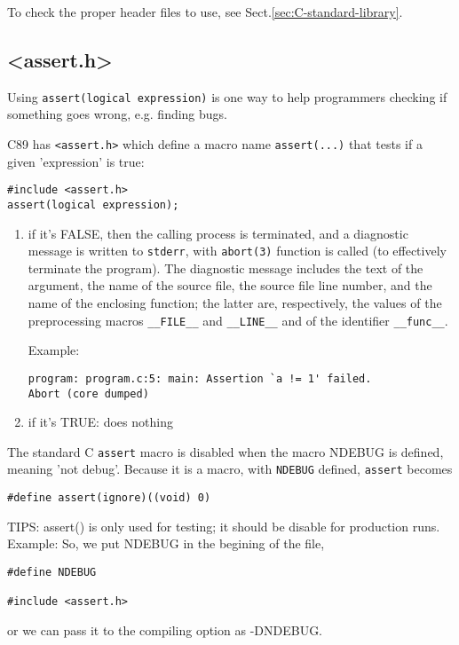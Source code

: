 To check the proper header files to use, see Sect.\ref{sec:C-standard-library}.



\subsection{<assert.h>}
\label{sec:C89_assert}
\label{sec:assert_C}

Using \verb!assert(logical expression)! is one way to help programmers checking
if something goes wrong, e.g. finding bugs.

C89 has \verb!<assert.h>! which define a macro name \verb!assert(...)!
that tests if a given 'expression' is true:

\begin{lstlisting}
#include <assert.h>
assert(logical expression);
\end{lstlisting}

\begin{enumerate}

  \item  if it's FALSE, then the calling process is terminated, and a diagnostic
  message is written to \verb!stderr!, with \verb!abort(3)! function is called
  (to effectively terminate the program).  The diagnostic message includes the
  text of the argument, the name of the source file, the source file line
  number, and the name of the enclosing function; the latter are, respectively,
  the values of the preprocessing macros \verb!__FILE__! and \verb!__LINE__! and
  of the identifier \verb!__func__!.   

Example:
\begin{verbatim}
program: program.c:5: main: Assertion `a != 1' failed.
Abort (core dumped)
\end{verbatim}
  \item if it's TRUE: does nothing
\end{enumerate}

The standard C \verb!assert! macro is disabled when the macro NDEBUG is
defined, meaning 'not debug'. Because it is a macro, with \verb!NDEBUG! defined,
\verb!assert! becomes
\begin{verbatim}
#define assert(ignore)((void) 0)
\end{verbatim}


TIPS: assert() is only used for testing; it should be disable for production
runs.  Example: So, we put NDEBUG in the begining of the file, 
\begin{verbatim}
#define NDEBUG

#include <assert.h>
\end{verbatim}
or we can pass it to the compiling option as -DNDEBUG.

